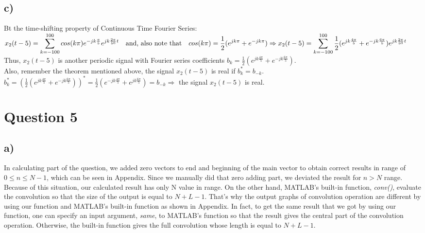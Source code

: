 \documentclass[12pt]{article}
\begin{document}
    \subsection*{c)}
    Bt the time-shifting property of Continuous Time Fourier Series: \\
    \begin{math} x_2(t-5) = \displaystyle\sum_{k=-100}^{100} cos(k\pi) e^{-jk\frac{\pi}{5}}e^{jk\frac{2\pi}{50}t}  \quad \textrm{and, also note that} \quad cos(k\pi) = \frac{1}{2}(e^{jk\pi}+e^{-jk\pi}) \\
    \Rightarrow x_2(t-5) = \displaystyle\sum_{k=-100}^{100} \frac{1}{2}(e^{jk\frac{4\pi}{5}}+e^{-jk\frac{6\pi}{5}}) e^{jk\frac{2\pi}{50}t} \end{math} \\
    Thus, \(x_2(t-5)\) is another periodic signal with Fourier series coefficients \(b_k = \frac{1}{2}(e^{jk\frac{4\pi}{5}}+e^{-jk\frac{6\pi}{5}})\). \\   
    Also, remember the theorem mentioned above, the signal \(x_2(t-5)\) is real if  \(b^{*}_k = b_{-k}\). \\   
    \begin{math} b^{*}_k = (\frac{1}{2}(e^{jk\frac{4\pi}{5}}+e^{-jk\frac{6\pi}{5}}))^{*} = \frac{1}{2}(e^{-jk\frac{4\pi}{5}}+e^{jk\frac{6\pi}{5}}) = b_{-k} \Rightarrow \end{math} the signal \(x_2(t-5)\) is real. \\ 
    \section*{Question 5}
    \subsection*{a)}
In calculating part of the question, we added zero vectors to end and beginning of the main vector to obtain correct results in range of \(0\leq n \leq N-1\), which can be seen in Appendix. Since we manually did that zero adding part, we deviated the result for \(n>N\) range. Because of this situation, our calculated result has only N value in range. On the other hand, MATLAB’s built-in function, \emph{conv()}, evaluate the convolution so that the size of the output is equal to \(N+L-1\). That's why the output graphs of convolution operation are different by using our function and MATLAB's built-in function as shown in Appendix. In fact, to get the same result that we got by using our function, one can specify an input argument, \emph{same}, to MATLAB's function so that the result gives the central part of the convolution operation. Otherwise, the built-in function gives the full convolution whose length is equal to \(N+L-1\).
\end{document}
